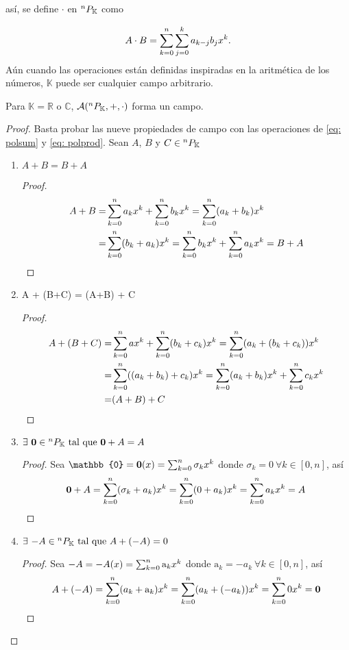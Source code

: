 así, se define \textbf{$\cdot$}  en ${^{n}P_{\mathbb{K}}}$ como

\begin{equation}
A \cdot B = \sum_{k=0}^n \sum_{j=0}^k a_{k-j}b_j x^k.
\label{eq: polprod}
\end{equation}
Aún cuando las operaciones están definidas inspiradas en la aritmética de los números, $\mathbb{K}$ puede ser cualquier campo arbitrario.

\begin{proposicion}
Para $\mathbb{K} = \mathbb{R}$ o $\mathbb{C}$, $\mathcal{A}(^{n}P_{\mathbb{K}},+,\cdot)$ forma un campo.
\end{proposicion}

\begin{proof}
Basta probar las nueve propiedades de campo con las operaciones de \ref{eq: polsum} y \ref{eq: polprod}.
Sean $A$, $B$ y $C \in {^{n}P_{\mathbb{K}}}$
\begin{enumerate}

 \item $ A + B = B + A $
 \begin{proof}
  \begin{align*}
   A + B =& \sum_{k=0}^n a_k x^k + \sum_{k=0}^n b_k x^k  = \sum_{k=0}^n (a_k + b_k) x^k \\ 
   =& \sum_{k=0}^n (b_k + a_k) x^k = \sum_{k=0}^n b_k x^k +     \sum_{k=0}^n a_k x^k = B + A
  \end{align*}
 \end{proof}
 
 \item A + (B+C) = (A+B) + C
 \begin{proof}
  \begin{align*}
   A + (B+C) =& \sum_{k=0}^n a x^k + \sum_{k=0}^n (b_k+c_k) x^k = \sum_{k=0}^n (a_k + (b_k + c_k)) x^k \\
   =&  \sum_{k=0}^n ((a_k + b_k) + c_k) x^k = \sum_{k=0}^n (a_k+b_k) x^k + \sum_{k=0}^n c_k x^k \\
   =& (A+B) + C 
  \end{align*}
 \end{proof}
 
 \item $\exists \  \mathbf{0} \in {^{n}P_{\mathbb{K}}} \text{ tal que }  \mathbf{0} + A = A $
 \begin{proof}
 Sea $\mathbb{0} = \mathbf{0}(x) = \polk{\sigma_k}$ donde $\sigma_k = 0 \ \forall k \in [0,n]$, así 
  \begin{align*}
  \mathbf{0} + A = \sum_{k=0}^n (\sigma_k + a_k) x^k = \sum_{k=0}^n (0 + a_k) x^k = \sum_{k=0}^n a_k x^k = A
  \end{align*}
 \end{proof}
 
 \item $\exists \ {-A} \in{^{n}P_{\mathbb{K}}}  \text{ tal que } A + (-A) = 0 $
 \begin{proof}
 Sea $-A = -A(x) = \sum_{k=0}^n \mathrm{a}_k x^k$ donde $\mathrm{a}_k = -a_k \ \forall k \in [0,n]$, así
  \begin{align*}
   A + (-A) = \sum_{k=0}^n (a_k + \mathrm{a}_k) x^k = \sum_{k=0}^n (a_k + (-a_k)) x^k = \sum_{k=0}^n 0 x^k = \mathbf{0}
  \end{align*}
 \end{proof}
 

\end{enumerate}
\end{proof}
